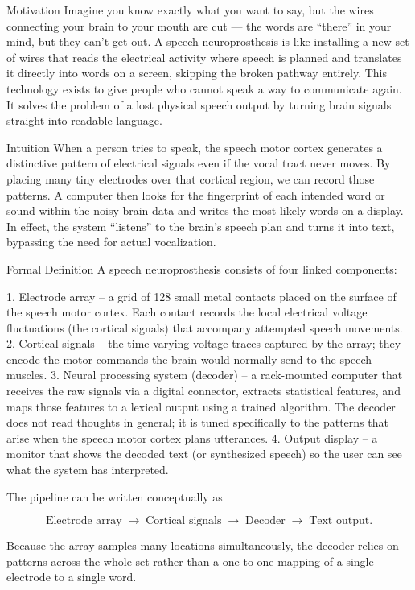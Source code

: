\documentclass[12pt, a4paper]{article}
\begin{document}
Motivation  
Imagine you know exactly what you want to say, but the wires connecting your brain to your mouth are cut --- the words are ``there'' in your mind, but they can't get out. A speech neuroprosthesis is like installing a new set of wires that reads the electrical activity where speech is planned and translates it directly into words on a screen, skipping the broken pathway entirely. This technology exists to give people who cannot speak a way to communicate again. It solves the problem of a lost physical speech output by turning brain signals straight into readable language.

Intuition  
When a person tries to speak, the speech motor cortex generates a distinctive pattern of electrical signals even if the vocal tract never moves. By placing many tiny electrodes over that cortical region, we can record those patterns. A computer then looks for the fingerprint of each intended word or sound within the noisy brain data and writes the most likely words on a display. In effect, the system ``listens'' to the brain's speech plan and turns it into text, bypassing the need for actual vocalization.

Formal Definition  
A speech neuroprosthesis consists of four linked components:

1. Electrode array -- a grid of 128 small metal contacts placed on the surface of the speech motor cortex. Each contact records the local electrical voltage fluctuations (the cortical signals) that accompany attempted speech movements.  
2. Cortical signals -- the time-varying voltage traces captured by the array; they encode the motor commands the brain would normally send to the speech muscles.  
3. Neural processing system (decoder) -- a rack-mounted computer that receives the raw signals via a digital connector, extracts statistical features, and maps those features to a lexical output using a trained algorithm. The decoder does not read thoughts in general; it is tuned specifically to the patterns that arise when the speech motor cortex plans utterances.  
4. Output display -- a monitor that shows the decoded text (or synthesized speech) so the user can see what the system has interpreted.

The pipeline can be written conceptually as  

\[
\text{Electrode array} \;\rightarrow\; \text{Cortical signals} \;\rightarrow\; \text{Decoder} \;\rightarrow\; \text{Text output}.
\]

Because the array samples many locations simultaneously, the decoder relies on patterns across the whole set rather than a one-to-one mapping of a single electrode to a single word.
\end{document}
